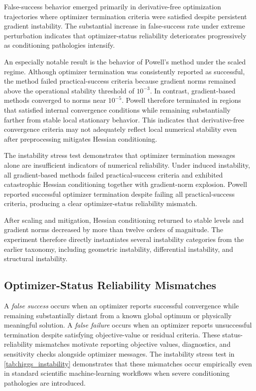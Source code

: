 False-success behavior emerged primarily in derivative-free optimization trajectories where optimizer termination criteria were satisfied despite persistent gradient instability. The substantial increase in false-success rate under extreme perturbation indicates that optimizer-status reliability deteriorates progressively as conditioning pathologies intensify.

An especially notable result is the behavior of Powell's method under the scaled regime. Although optimizer termination was consistently reported as successful, the method failed practical-success criteria because gradient norms remained above the operational stability threshold of \(10^{-3}\). In contrast, gradient-based methods converged to norms near \(10^{-5}\). Powell therefore terminated in regions that satisfied internal convergence conditions while remaining substantially farther from stable local stationary behavior. This indicates that derivative-free convergence criteria may not adequately reflect local numerical stability even after preprocessing mitigates Hessian conditioning.

The instability stress test demonstrates that optimizer termination messages alone are insufficient indicators of numerical reliability. Under induced instability, all gradient-based methods failed practical-success criteria and exhibited catastrophic Hessian conditioning together with gradient-norm explosion. Powell reported successful optimizer termination despite failing all practical-success criteria, producing a clear optimizer-status reliability mismatch.

After scaling and mitigation, Hessian conditioning returned to stable levels and gradient norms decreased by more than twelve orders of magnitude. The experiment therefore directly instantiates several instability categories from the earlier taxonomy, including geometric instability, differential instability, and structural instability.


\subsection{Optimizer-Status Reliability Mismatches}

A \emph{false success} occurs when an optimizer reports successful convergence while remaining substantially distant from a known global optimum or physically meaningful solution. A \emph{false failure} occurs when an optimizer reports unsuccessful termination despite satisfying objective-value or residual criteria. These status-reliability mismatches motivate reporting objective values, diagnostics, and sensitivity checks alongside optimizer messages. The instability stress test in \cref{tab:higgs_instability} demonstrates that these mismatches occur empirically even in standard scientific machine-learning workflows when severe conditioning pathologies are introduced.

